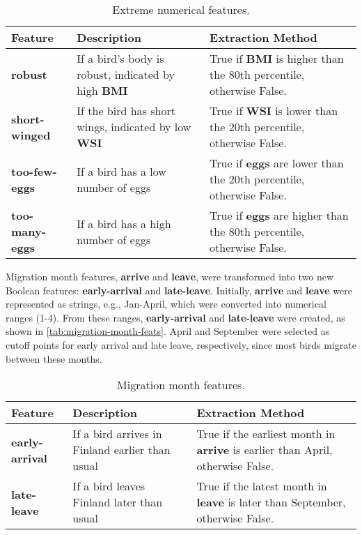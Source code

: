 \begin{table}[h]
    \centering
    \begin{tabular}{|p{3cm}|p{6cm}|p{6cm}|}
        \hline
        Feature & Description & Extraction Method \\
        \hline
        \textbf{robust} & If a bird's body is robust, indicated by high \textbf{BMI} &
        True if \textbf{BMI} is higher than the 80th percentile, otherwise False. \\
        \hline
        \textbf{short-winged} & If the bird has short wings, indicated by low 
        \textbf{WSI} & True if \textbf{WSI} is lower than the 20th percentile, 
        otherwise False. \\
        \hline
        \textbf{too-few-eggs} & If a bird has a low number of eggs & True if
        \textbf{eggs} are lower than the 20th percentile, otherwise False. \\
        \hline
        \textbf{too-many-eggs} & If a bird has a high number of eggs & True if
        \textbf{eggs} are higher than the 80th percentile, otherwise False. \\
        \hline
    \end{tabular}
    \caption{Extreme numerical features.}
    \label{tab:extreme-num-vals}
\end{table}

Migration month features, \textbf{arrive} and \textbf{leave}, were transformed
into two new Boolean features: \textbf{early-arrival} and \textbf{late-leave}.
Initially, \textbf{arrive} and \textbf{leave} were represented as strings, 
e.g., Jan-April, which were converted into numerical ranges (1-4). From these
ranges, \textbf{early-arrival} and \textbf{late-leave} were created, as shown
in \autoref{tab:migration-month-feats}. April and September were selected as 
cutoff points for early arrival and late leave, respectively, since most birds
migrate between these months.

\begin{table}[h]
    \centering
    \begin{tabular}{|p{3cm}|p{6cm}|p{6cm}|}
        \hline
        Feature & Description & Extraction Method \\
        \hline
        \textbf{early-arrival} & If a bird arrives in Finland earlier than usual &
        True if the earliest month in \textbf{arrive} is earlier than April, otherwise 
        False. \\
        \hline
        \textbf{late-leave} & If a bird leaves Finland later than usual & True if
        the latest month in \textbf{leave} is later than September, otherwise False. \\
        \hline
    \end{tabular}
    \caption{Migration month features.}
    \label{tab:migration-month-feats}
\end{table}

